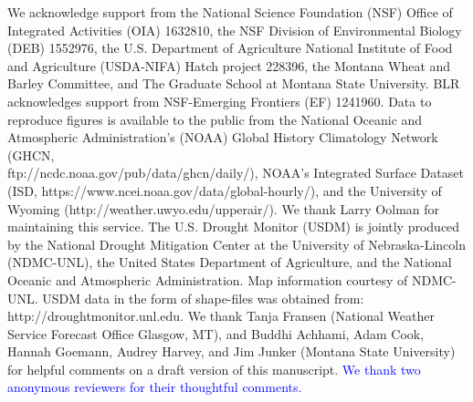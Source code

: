 \documentclass[hess, manuscript]{copernicus}
\def\TG{\textcolor{blue}}
\begin{document}
\begin{acknowledgements}
\sloppy
We acknowledge support from the National Science Foundation (NSF) Office of Integrated Activities (OIA) 1632810, the NSF Division of Environmental Biology (DEB) 1552976, the U.S. Department of Agriculture National Institute of Food and Agriculture (USDA-NIFA) Hatch project 228396, the Montana Wheat and Barley Committee, and The Graduate School at Montana State University. BLR acknowledges support from NSF-Emerging Frontiers (EF) 1241960. Data to reproduce figures is available to the public from the National Oceanic and Atmospheric Administration’s (NOAA) Global History Climatology Network (GHCN, \\ 
 ftp://ncdc.noaa.gov/pub/data/ghcn/daily/), NOAA's Integrated Surface Dataset (ISD, https://www.ncei.noaa.gov/data/global-hourly/), and the University of Wyoming (http://weather.uwyo.edu/upperair/). We thank Larry Oolman for maintaining this service. The U.S. Drought Monitor (USDM) is jointly produced by the National Drought Mitigation Center at the University of Nebraska-Lincoln (NDMC-UNL), the United States Department of Agriculture, and the National Oceanic and Atmospheric Administration. Map information courtesy of NDMC-UNL. USDM data in the form of shape-files was obtained from: http://droughtmonitor.unl.edu. We thank Tanja Fransen (National Weather Service Forecast Office Glasgow, MT), and Buddhi Achhami, Adam Cook, Hannah Goemann, Audrey Harvey, and Jim Junker (Montana State University) for helpful comments on a draft version of this manuscript. \TG{We thank two anonymous reviewers for their thoughtful comments.} 
\fussy
\end{acknowledgements}







 
 
\end{document}
